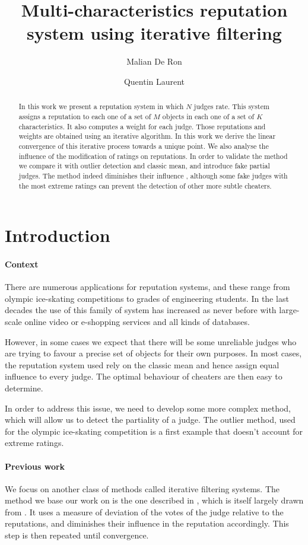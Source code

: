 \documentclass[12pt,a4paper]{article}
\title{Multi-characteristics reputation system using iterative filtering}
\author{Malian De Ron \and Quentin Laurent}
\begin{document}
\maketitle
\begin{abstract}
In this work we present a reputation system in which $N$ judges rate. This system assigns a reputation to each one of a set of $M$ objects in each one of a set of $K$ characteristics. It also computes a weight for each judge. Those reputations and weights are obtained using an iterative algorithm. In this work we derive the linear convergence of this iterative process towards a unique point. We also analyse the influence of the modification of ratings on reputations. In order to validate the method we compare it with outlier detection and classic mean, and introduce fake partial judges. The method indeed diminishes their influence , although some fake judges with the most extreme ratings can prevent the detection of other more subtle cheaters. \end{abstract}
\tableofcontents
\section{Introduction}
\paragraph{Context}
There are numerous applications for reputation systems, and these range from olympic ice-skating competitions to grades of engineering students. 
In the last decades the use of this family of system has increased as never before with large-scale online video or e-shopping services and all kinds of databases.

However, in some cases we expect that there will be some unreliable judges who are trying to favour a precise set of objects for their own purposes. In most cases, the reputation system used rely on the classic mean and hence assign equal influence to every judge. The optimal behaviour of cheaters are then easy to determine. 

In order to address this issue, we need to develop some more complex method, which will allow us to detect the partiality of a judge. The outlier method, used for the olympic ice-skating competition is a first example that doesn't account for extreme ratings.
\paragraph{Previous work}
We focus on another class of methods called iterative filtering systems. The method we base our work on is the one described in \cite{Cristo1}, which is itself largely drawn from \cite{laureti2006information}. It uses a measure of deviation of the votes of the judge relative to the reputations, and diminishes their influence in the reputation accordingly. This step is then repeated until convergence.
\end{document}
